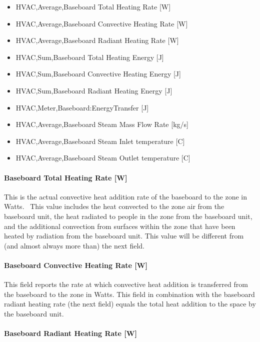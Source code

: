 \begin{itemize}
\item
  HVAC,Average,Baseboard Total Heating Rate {[}W{]}
\item
  HVAC,Average,Baseboard Convective Heating Rate {[}W{]}
\item
  HVAC,Average,Baseboard Radiant Heating Rate {[}W{]}
\item
  HVAC,Sum,Baseboard Total Heating Energy {[}J{]}
\item
  HVAC,Sum,Baseboard Convective Heating Energy {[}J{]}
\item
  HVAC,Sum,Baseboard Radiant Heating Energy {[}J{]}
\item
  HVAC,Meter,Baseboard:EnergyTransfer {[}J{]}
\item
  HVAC,Average,Baseboard Steam Mass Flow Rate {[}kg/s{]}
\item
  HVAC,Average,Baseboard Steam Inlet temperature {[}C{]}
\item
  HVAC,Average,Baseboard Steam Outlet temperature {[}C{]}
\end{itemize}

\paragraph{Baseboard Total Heating Rate {[}W{]}}\label{baseboard-total-heating-rate-w-1}

This is the actual convective heat addition rate of the baseboard to the zone in Watts.~ This value includes the heat convected to the zone air from the baseboard unit, the heat radiated to people in the zone from the baseboard unit, and the additional convection from surfaces within the zone that have been heated by radiation from the baseboard unit. This value will be different from (and almost always more than) the next field.

\paragraph{Baseboard Convective Heating Rate {[}W{]}}\label{baseboard-convective-heating-rate-w-1}

This field reports the rate at which convective heat addition is transferred from the baseboard to the zone in Watts.  This field in combination with the baseboard radiant heating rate (the next field) equals the total heat addition to the space by the baseboard unit.

\paragraph{Baseboard Radiant Heating Rate {[}W{]}}\label{baseboard-radiant-heating-rate-w-1}

